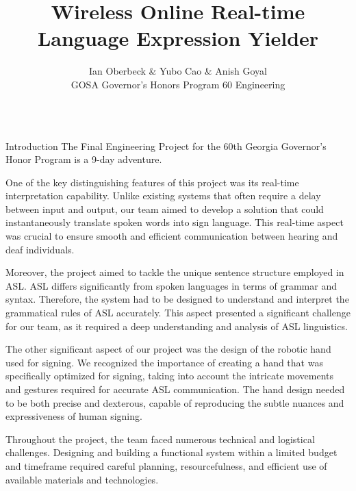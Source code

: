 \documentclass[final, 20pt]{beamer}
\title{Wireless Online Real-time Language Expression Yielder}
\author{Ian Oberbeck \& Yubo Cao \& Anish Goyal \\\normalfont GOSA Governor's Honors Program 60 Engineering}
\newlength{\colwidth}
\begin{document}
\begin{frame}[t]
\centering
\begin{columns}[t]
\margincolumn

\begin{column}{\colwidth}
  \begin{block}{Introduction}
    The Final Engineering Project for the 60th Georgia Governor's Honor Program is a 9-day adventure.


    One of the key distinguishing features of this project was its real-time interpretation capability. Unlike existing systems that often require a delay between input and output, our team aimed to develop a solution that could instantaneously translate spoken words into sign language. This real-time aspect was crucial to ensure smooth and efficient communication between hearing and deaf individuals.

    Moreover, the project aimed to tackle the unique sentence structure employed in ASL. ASL differs significantly from spoken languages in terms of grammar and syntax. Therefore, the system had to be designed to understand and interpret the grammatical rules of ASL accurately. This aspect presented a significant challenge for our team, as it required a deep understanding and analysis of ASL linguistics.

    The other significant aspect of our project was the design of the robotic hand used for signing. We recognized the importance of creating a hand that was specifically optimized for signing, taking into account the intricate movements and gestures required for accurate ASL communication. The hand design needed to be both precise and dexterous, capable of reproducing the subtle nuances and expressiveness of human signing.

    Throughout the project, the team faced numerous technical and logistical challenges. Designing and building a functional system within a limited budget and timeframe required careful planning, resourcefulness, and efficient use of available materials and technologies.



\end{block}
\end{column}
\end{columns}
\end{frame}
\end{document}
